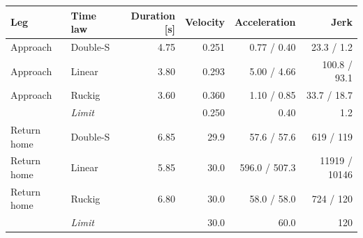 \begin{tabular}{@{}llrrrr@{}}
\toprule
\textbf{Leg} & \textbf{Time law} & \textbf{Duration [s]} & \textbf{Velocity} & \textbf{Acceleration} & \textbf{Jerk} \\
\midrule
Approach & Double-S & 4.75 & 0.251 & 0.77 / 0.40 & 23.3 / 1.2 \\
Approach & Linear & 3.80 & 0.293 & 5.00 / 4.66 & 100.8 / 93.1 \\
Approach & Ruckig & 3.60 & 0.360 & 1.10 / 0.85 & 33.7 / 18.7 \\
& \emph{Limit} & & 0.250 & 0.40 & 1.2 \\
\midrule
Return home & Double-S & 6.85 & 29.9 & 57.6 / 57.6 & 619 / 119 \\
Return home & Linear & 5.85 & 30.0 & 596.0 / 507.3 & 11919 / 10146 \\
Return home & Ruckig & 6.80 & 30.0 & 58.0 / 58.0 & 724 / 120 \\
& \emph{Limit} & & 30.0 & 60.0 & 120 \\
\bottomrule
\end{tabular}
